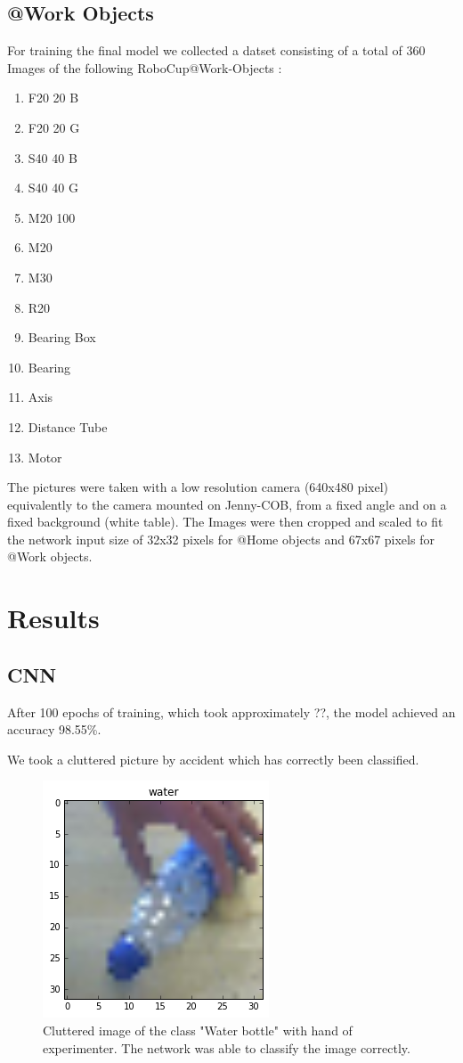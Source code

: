 \documentclass[	DIV=calc,%
				paper=a4,%
				fontsize=11pt,%
				twocolumn]{scrartcl}	 %
\begin{document}
\subsection*{@Work Objects}
For training the final model we collected a datset consisting of a total of 360 Images of the following RoboCup@Work-Objects \cite{robocup_atwork_rulebook}:
\begin{enumerate}
	\item F20 20 B
	\item F20 20 G
	\item S40 40 B 
	\item S40 40 G
	\item M20 100 
	\item M20 
	\item M30
	\item R20
	\item Bearing Box
	\item Bearing
	\item Axis
	\item Distance Tube 
	\item Motor 
\end{enumerate}

The pictures were taken with a low resolution camera (640x480 pixel) equivalently to the camera mounted on Jenny-COB, from a fixed angle and on a fixed background (white table).
The Images were then cropped and scaled to fit the network input size of 32x32 pixels for @Home objects and 67x67 pixels for @Work objects.

\section{Results}

\subsection*{CNN}
After 100 epochs of training, which took approximately ??, the model achieved an accuracy 98.55\%.

We took a cluttered picture by accident which has correctly been classified.

\begin{figure}[H]
    \centering
    \includegraphics[width=0.5\linewidth]{data/cluttered_image}
    \caption{Cluttered image of the class "Water bottle" with hand of experimenter. The network was able to classify the image correctly.}
\end{figure}
\end{document}
